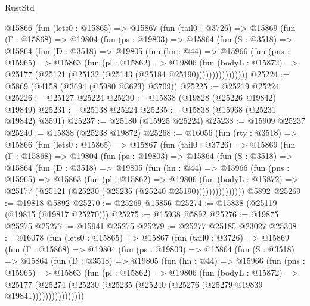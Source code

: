 \begin{lexlean}{RustStd}
\begin{coremodule}
      @15866
        (fun (lets0 : @15865) =>
        @15867
          (fun (tail0 : @3726) =>
          @15869
            (fun (Γ : @15868) =>
            @19804
              (fun (ps : @19803) =>
              @15864
                (fun (S : @3518) =>
                @15864
                  (fun (D : @3518) =>
                  @19805
                    (fun (hn : @44) =>
                    @15966
                      (fun (pns : @15965) =>
                      @15863
                        (fun (pl : @15862) =>
                        @19806
                          (fun (bodyL : @15872) =>
                          @25177 (@25121 (@25132 (@25143 (@25184 @25190))))))))))))))))
@25224 := @5869 (@4158 (@3694 (@5980 @3623) @3709))
@25225 := @25219 @25224
@25226 := @25127 @25224
@25230 := @15838 (@19828 (@25226 @19842) @19849)
@25231 := @25138 @25224
@25235 := @15838 (@15968 (@25231 @19842) @3591)
@25237 := @25180 (@15925 @25224)
@25238 := @15909 @25237
@25240 := @15838 (@25238 @19872)
@25268 := @16056
    (fun (rty : @3518) =>
    @15866
      (fun (lets0 : @15865) =>
      @15867
        (fun (tail0 : @3726) =>
        @15869
          (fun (Γ : @15868) =>
          @19804
            (fun (ps : @19803) =>
            @15864
              (fun (S : @3518) =>
              @15864
                (fun (D : @3518) =>
                @19805
                  (fun (hn : @44) =>
                  @15966
                    (fun (pns : @15965) =>
                    @15863
                      (fun (pl : @15862) =>
                      @19806
                        (fun (bodyL : @15872) =>
                        @25177 (@25121 (@25230 (@25235 (@25240 @25190)))))))))))))))
    @5892
@25269 := @19818 @5892
@25270 := @25269 @15856
@25274 := @15838 (@25119 (@19815 (@19817 @25270)))
@25275 := @15938 @5892
@25276 := @19875 @25275
@25277 := @15941 @25275
@25279 := @25277 @25185 @23027
@25308 := @16078
    (fun (lets0 : @15865) =>
    @15867
      (fun (tail0 : @3726) =>
      @15869
        (fun (Γ : @15868) =>
        @19804
          (fun (ps : @19803) =>
          @15864
            (fun (S : @3518) =>
            @15864
              (fun (D : @3518) =>
              @19805
                (fun (hn : @44) =>
                @15966
                  (fun (pns : @15965) =>
                  @15863
                    (fun (pl : @15862) =>
                    @19806
                      (fun (bodyL : @15872) =>
                      @25177
                        (@25274
                          (@25230 (@25235 (@25240 (@25276 (@25279 @19839 @19841))))))))))))))))

\end{coremodule}
\end{lexlean}
